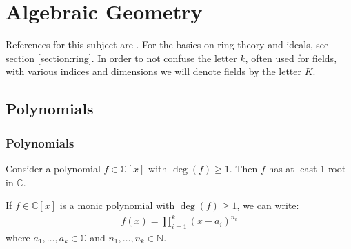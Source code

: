 \chapter{Algebraic Geometry}\label{chapter:alggeom}

    References for this subject are \cite{gathmann, redbook}. For the basics on ring theory and ideals, see section \ref{section:ring}. In order to not confuse the letter $k$, often used for fields, with various indices and dimensions we will denote fields by the letter $K$.

\section{Polynomials}
\subsection{Polynomials}



    \begin{theorem}\label{linalgebra:fundamental_theorem_of_algebra}
        Consider a polynomial $f\in\mathbb{C}[x]$ with $\deg(f)\geq 1$. Then $f$ has at least 1 root in $\mathbb{C}$.
    \end{theorem}
    \begin{result}
        If $f\in \mathbb{C}[x]$ is a monic polynomial with $\deg(f)\geq1$, we can write:
        \begin{gather*}
            f(x) = \prod_{i=1}^k(x-a_i)^{n_i}
        \end{gather*}
        where $a_1,\ldots, a_k\in\mathbb{C}$ and $n_1,\ldots, n_k\in\mathbb{N}$.
    \end{result}


